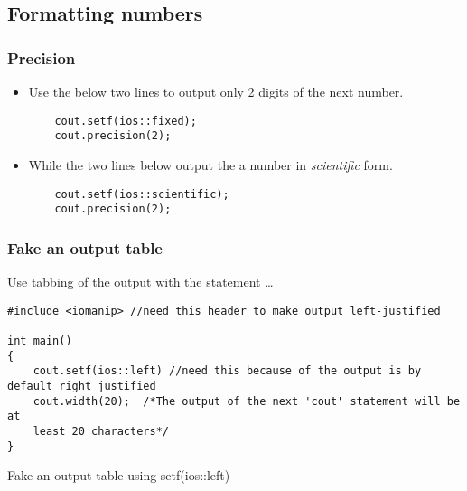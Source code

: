 
\subsection{Formatting numbers}

\subsubsection*{Precision}
\begin{itemize}
	\item Use the below two lines to output only 2 digits of the next number.
	\begin{verbatim}
	cout.setf(ios::fixed);
	cout.precision(2);
	\end{verbatim}
	\item While the two lines below output the a number in \emph{scientific} form.
	\begin{verbatim}
	cout.setf(ios::scientific); 
	cout.precision(2);
	\end{verbatim}
\end{itemize}


\subsubsection*{Fake an output table}
Use tabbing of the output with the statement \ldots
\begin{listing}[h]
\begin{verbatim}
#include <iomanip> //need this header to make output left-justified

int main()
{
	cout.setf(ios::left) //need this because of the output is by default right justified
	cout.width(20);  /*The output of the next 'cout' statement will be at
	least 20 characters*/
}
\end{verbatim}
\caption{Fake an output table using setf(ios::left)}
\label{source_code_3}
\end{listing}


